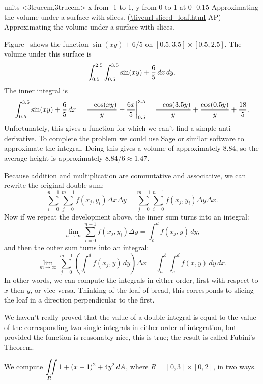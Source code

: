 \figure
\texonly
\vbox{\beginpicture
\normalgraphs
\ninepoint
\setcoordinatesystem units <3truecm,3truecm>
\setplotarea x from -1 to 1, y from 0 to 1
 at 0 -0.15
\endpicture}
\begincaption
Approximating the volume under a surface with slices.
(\expandafter\url\expandafter{\liveurl sliced_loaf.html}%
AP\endurl)
\endcaption
\endtexonly
{}
\begincaption
Approximating the volume under a surface with slices.
\endcaption
\endfigure

\example Figure~ shows the function
$\sin(xy)+6/5$ on $[0.5,3.5]\times[0.5,2.5]$. The volume under this
surface is
$$\int_{0.5}^{2.5}\int_{0.5}^{3.5} \sin(xy)+{6\over5}\,dx\,dy.$$
The inner integral is
$$\int_{0.5}^{3.5} \sin(xy)+{6\over5}\,dx=
\left.{-\cos(xy)\over y}+{6x\over5}\right|_{0.5}^{3.5}=
{-\cos(3.5y)\over y}+{\cos(0.5y)\over y}+{18\over5}.$$
Unfortunately, this gives a function for which we can't find a simple
anti-derivative. To complete the problem we could use Sage or similar
software to approximate the integral. Doing this gives a volume of
approximately $8.84$, so the average height is approximately 
$8.84/6\approx 1.47$.
\endexample

Because addition and multiplication are commutative and associative,
we can rewrite the original double sum:
$$
\sum_{i=0}^{n-1}\sum_{j=0}^{m-1}f(x_j,y_i)\Delta
  x\Delta y=\sum_{j=0}^{m-1}\sum_{i=0}^{n-1}f(x_j,y_i)\Delta
  y\Delta x.
$$
Now if we repeat the development above, the inner sum turns into
an integral:
$$\lim_{n\to\infty}\sum_{i=0}^{n-1}f(x_j,y_i)\Delta
  y = \int_c^d f(x_j,y)\,dy,$$
and then the outer sum turns into an integral:
$$\lim_{m\to\infty}\sum_{j=0}^{m-1}\left(\int_c^d f(x_j,y)\,dy
\right)\Delta x = 
\int_a^b\int_c^d f(x,y)\,dy\,dx.$$
In other words, we can compute the integrals in either order, first
with respect to $x$ then $y$, or vice versa. Thinking of the loaf of
bread, this corresponds to slicing the loaf in a direction
perpendicular to the first. 

We haven't really proved that the value of a double integral is equal
to the value of the corresponding two single integrals in either order
of integration, but provided the function is reasonably nice, this is
true; the result is called {\dfont Fubini's Theorem}.

\example
We compute $\ds\dint{R} 1+(x-1)^2+4y^2\,dA$, where
$R=[0,3]\times[0,2]$, in two ways.

